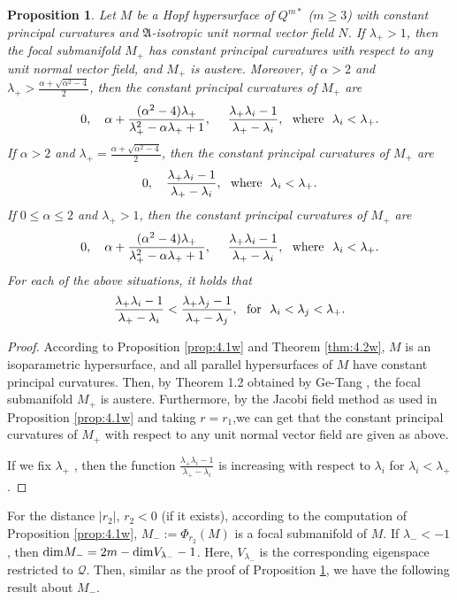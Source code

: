 \documentclass[reqno]{amsart}%
\newtheorem{proposition}[theorem]{Proposition}
\theoremstyle{definition}
\numberwithin{equation}{section}
\begin{document}
\begin{proposition}\label{prop:4.3w}
Let $M$ be a Hopf hypersurface of $Q^{m*}$ ($m\geq3$) with constant principal curvatures and $\mathfrak{A}$-isotropic unit normal vector field $N$. If $\lambda_+>1$, then the focal submanifold $M_+$ has constant principal curvatures with respect to any unit normal vector field, and $M_+$ is austere.
Moreover, if $\alpha>2$ and $\lambda_+>\frac{\alpha+\sqrt{\alpha^2-4}}{2}$, then
the constant principal curvatures of $M_+$ are
$$
0,\ \ \ \alpha+\frac{(\alpha^2-4)\lambda_+}{\lambda_+^2-\alpha\lambda_++1},
\ \ \ \ \frac{\lambda_+\lambda_i-1}{\lambda_+-\lambda_i},\ \  {\rm where}\ \  \lambda_i<\lambda_+.
$$
If $\alpha>2$ and $\lambda_+=\frac{\alpha+\sqrt{\alpha^2-4}}{2}$, then
the constant principal curvatures of $M_+$ are
$$
0,\ \ \ \frac{\lambda_+\lambda_i-1}{\lambda_+-\lambda_i},\ \  {\rm where}\ \  \lambda_i<\lambda_+.
$$
If $0\leq\alpha\leq2$ and $\lambda_+>1$, then
the constant principal curvatures of $M_+$ are
$$
0,\ \ \ \alpha+\frac{(\alpha^2-4)\lambda_+}{\lambda_+^2-\alpha\lambda_++1},
\ \ \ \ \frac{\lambda_+\lambda_i-1}{\lambda_+-\lambda_i},\ \  {\rm where}\ \  \lambda_i<\lambda_+.
$$
For each of the above situations, it holds that
$$
\frac{\lambda_+\lambda_i-1}{\lambda_+-\lambda_i}
<\frac{\lambda_+\lambda_j-1}{\lambda_+-\lambda_j},
\ \ {\rm for}\ \ \lambda_i<\lambda_j<\lambda_+.
$$
\end{proposition}
%
\begin{proof}
According to Proposition \ref{prop:4.1w} and Theorem \ref{thm:4.2w},
$M$ is an isoparametric hypersurface,
and all parallel hypersurfaces of $M$ have constant principal curvatures.
Then, by Theorem 1.2 obtained by Ge-Tang \cite{GT}, the focal submanifold $M_+$ is austere.
Furthermore, by the Jacobi field method as used in Proposition \ref{prop:4.1w} and  taking $r=r_1$,we can get that the constant principal curvatures of $M_+$ with respect to any unit normal vector field are given as above.

If we fix $\lambda_+$ , then the function
$\frac{{\lambda_+}\lambda_i-1}{{\lambda_+}-\lambda_i}$ is increasing with respect to $\lambda_i$
for $\lambda_i<\lambda_+$.
\end{proof}




For the distance $|r_2|$, $r_2<0$ (if it exists), according to the computation of Proposition \ref{prop:4.1w}, $M_-:=\Phi_{r_2}(M)$ is a focal
submanifold of $M$. If $\lambda_-<-1$, then
${\rm dim}M_-=2m-{\rm dim}V_{\lambda_-}-1$.
Here, $V_{\lambda_-}$ is the corresponding eigenspace
restricted to $\mathcal{Q}$.
Then, similar as the proof of Proposition \ref{prop:4.3w}, we have the following result about $M_-$.
\end{document}
